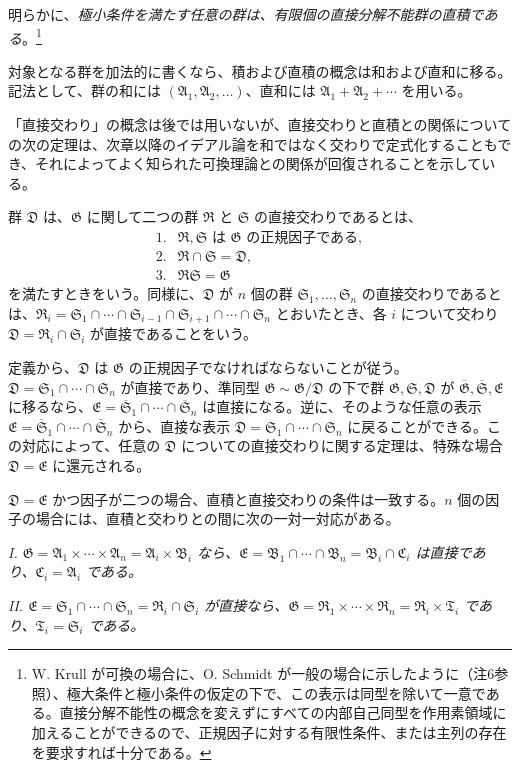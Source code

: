 \documentclass[11pt]{article}
\providecommand{\mG}{\mathfrak{G}}
\providecommand{\mA}{\mathfrak{A}}
\providecommand{\mB}{\mathfrak{B}}
\providecommand{\mC}{\mathfrak{C}}
\providecommand{\mD}{\mathfrak{D}}
\providecommand{\mE}{\mathfrak{E}}
\providecommand{\mR}{\mathfrak{R}}
\providecommand{\mS}{\mathfrak{S}}
\providecommand{\mT}{\mathfrak{T}}
\begin{document}
明らかに、\emph{極小条件を満たす任意の群は、有限個の直接分解不能群の直積である}。\footnote{W. Krull が可換の場合に、O. Schmidt が一般の場合に示したように（注6参照）、極大条件と極小条件の仮定の下で、この表示は同型を除いて一意である。直接分解不能性の概念を変えずにすべての内部自己同型を作用素領域に加えることができるので、正規因子に対する有限性条件、または主列の存在を要求すれば十分である。}

対象となる群を加法的に書くなら、積および直積の概念は和および直和に移る。記法として、群の和には $(\mA_1,\mA_2,\ldots)$、直和には $\mA_1+\mA_2+\cdots$ を用いる。

「直接交わり」の概念は後では用いないが、直接交わりと直積との関係についての次の定理は、次章以降のイデアル論を和ではなく交わりで定式化することもでき、それによってよく知られた可換理論との関係が回復されることを示している。

群 $\mD$ は、$\mG$ に関して二つの群 $\mR$ と $\mS$ の直接交わりであるとは、
\[
\begin{array}{ll}
1.& \mR,\mS\text{ は }\mG\text{ の正規因子である},\\
2.& \mR\cap\mS=\mD,\\
3.& \mR\mS=\mG
\end{array}
\]
を満たすときをいう。同様に、$\mD$ が $n$ 個の群 $\mS_1,\ldots,\mS_n$ の直接交わりであるとは、$\mR_i=\mS_1\cap\cdots\cap\mS_{i-1}\cap\mS_{i+1}\cap\cdots\cap\mS_n$ とおいたとき、各 $i$ について交わり $\mD=\mR_i\cap\mS_i$ が直接であることをいう。

定義から、$\mD$ は $\mG$ の正規因子でなければならないことが従う。$\mD=\mS_1\cap\cdots\cap\mS_n$ が直接であり、準同型 $\mG\sim\mG/\mD$ の下で群 $\mG,\mS,\mD$ が $\overline{\mG},\overline{\mS},\mE$ に移るなら、$\mE=\overline{\mS}_1\cap\cdots\cap\overline{\mS}_n$ は直接になる。逆に、そのような任意の表示 $\mE=\overline{\mS}_1\cap\cdots\cap\overline{\mS}_n$ から、直接な表示 $\mD=\mS_1\cap\cdots\cap\mS_n$ に戻ることができる。この対応によって、任意の $\mD$ についての直接交わりに関する定理は、特殊な場合 $\mD=\mE$ に還元される。

$\mD=\mE$ かつ因子が二つの場合、直積と直接交わりの条件は一致する。$n$ 個の因子の場合には、直積と交わりとの間に次の一対一対応がある。

\emph{I. $\mG=\mA_1\times\cdots\times\mA_n=\mA_i\times\mB_i$ なら、$\mE=\mB_1\cap\cdots\cap\mB_n=\mB_i\cap\mC_i$ は直接であり、$\mC_i=\mA_i$ である。}

\emph{II. $\mE=\mS_1\cap\cdots\cap\mS_n=\mR_i\cap\mS_i$ が直接なら、$\mG=\mR_1\times\cdots\times\mR_n=\mR_i\times\mT_i$ であり、$\mT_i=\mS_i$ である。}
\end{document}
